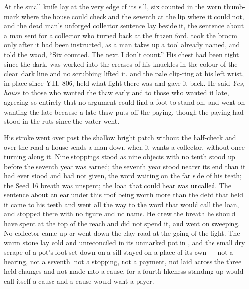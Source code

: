 \scenebreak

At  the small knife lay at the very edge of its sill, six counted in the worn thumb-mark where the house could check and the seventh at the lip where it could not, and the dead man's unforged collector sentence lay beside it, the sentence about a man sent for a collector who turned back at the frozen ford.  took the broom only after it had been instructed, as a man takes up a tool already named, and told the wood, “Six counted. The next I don't count.” His chest had been tight since the dark.  was worked into the creases of his knuckles in the colour of the clean dark line and no scrubbing lifted it, and the pale clip-ring at his left wrist, in place since Y.H. 806, held what light there was and gave it back. He said \emph{Yes, house} to those who wanted the thaw early and to those who wanted it late, agreeing so entirely that no argument could find a foot to stand on, and went on wanting the late because a late thaw puts off the paying, though the paying had stood in the ruts since the water went.

His stroke went over  past the shallow bright patch without the half-check and over the road a house sends a man down when it wants a collector, without once turning along it. Nine stoppings stood as nine objects with no tenth stood up before the seventh year was earned; the seventh year stood nearer its end than it had ever stood and had not given, the word waiting on the far side of his teeth; the Seed 16 breath was unspent; the loan that could hear was uncalled. The sentence about an ear under this roof being worth more than the debt that held it came to his teeth and went all the way to the word that would call the loan, and stopped there with no figure and no name. He drew the breath he should have spent at the top of the reach and did not spend it, and went on sweeping. No collector came up or went down the clay road at the going of the light. The warm stone lay cold and unreconciled in its unmarked pot in , and the small dry scrape of a pot's foot set down on a sill stayed on a place of its own --- not a hearing, not a seventh, not a stopping, not a payment, not laid across the three held changes and not made into a cause, for a fourth likeness standing up would call itself a cause and a cause would want a payer.

\scenebreak

